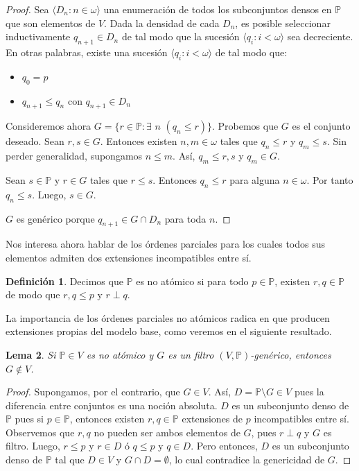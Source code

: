\documentclass[11pt]{unam_tesis1}
\theoremstyle{MyThmStyle}
\theoremstyle{definition}
\newtheorem{definition}{Definici\'on}[chapter]
\theoremstyle{plain}
\newtheorem{lemma}[definition]{Lema}
\theoremstyle{remark}
\let\leq\leqslant
\begin{document}
\begin{proof}
Sea $\langle D_n:n\in \omega \rangle$ una enumeraci\'on de todos los subconjuntos densos en $\mathbb P$ que son elementos de $V$. Dada la densidad de cada $D_n$, es posible seleccionar inductivamente $q_{n+1} \in D_n$ de tal modo que la sucesi\'on $\langle q_i : i<\omega \rangle$ sea decreciente. En otras palabras, existe una sucesi\'on $\langle q_i:i< \omega \rangle$ de tal modo que:

\begin{itemize}

\item $q_0=p$
\item $q_{n+1}\leq q_n$ con $q_{n+1}\in D_n$

\end{itemize}

Consideremos ahora $G=\{r\in \mathbb P:\exists$ $n$ $(q_n\leq r) \}$. Probemos que $G$ es el conjunto deseado. Sean $r,s\in G$. Entonces existen $n,m\in \omega$ tales que $q_n\leq r$ y $q_m\leq s$. Sin perder generalidad, supongamos $n\leq m$. As\'i, $q_m\leq r,s$ y $q_m\in G$.

Sean $s\in \mathbb P$ y $r\in G$ tales que $r\leq s$. Entonces $q_n\leq r$ para alguna $n\in \omega $. Por tanto $q_n\leq s$. Luego, $s\in G$.

$G$ es gen\'erico porque $q_{n+1}\in G\cap D_n$ para toda $n$.
\end{proof}

Nos interesa ahora hablar de los \'ordenes parciales para los cuales todos sus elementos admiten dos extensiones incompatibles entre s\'i.

\begin{definition}\label{ordennoatomico}
Decimos que $\mathbb P$ es no at\'omico si para todo $p\in \mathbb P$, existen $r,q\in \mathbb P$ de modo que $r,q\leq p$ y $r\perp q$.
\end{definition}

La importancia de los \'ordenes parciales no at\'omicos radica en que producen extensiones propias del modelo base, como veremos en el siguiente resultado.

\begin{lemma}\label{noatomico}
Si $\mathbb P\in V$ es no at\'omico y $G$ es un filtro $(V,\mathbb P)$-gen\'erico, entonces $G\notin V$.
\end{lemma}

\begin{proof}
Supongamos, por el contrario, que  $G\in V$. As\'i, $D=\mathbb P\setminus G\in V$ pues la diferencia entre conjuntos es una noci\'on absoluta. $D$ es un subconjunto denso de $\mathbb P$ pues si $p\in \mathbb P$, entonces existen $r,q\in \mathbb P$ extensiones de $p$ incompatibles entre s\'i. Observemos que $r,q$ no pueden ser ambos elementos de $G$, pues $r\perp q$ y $G$ es filtro. Luego, $r\leq p$ y $r\in D$ \'o $q\leq p$ y $q\in D$. Pero entonces, $D$ es un subconjunto denso de $\mathbb P$ tal que $D\in V$ y $G\cap D=\emptyset$, lo cual contradice la genericidad de $G$.
\end{proof}
\end{document}
